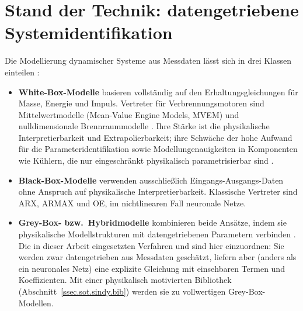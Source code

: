 
\chapter{Stand der Technik: datengetriebene Systemidentifikation}
\label{ch.standderTechnik}

Die Modellierung dynamischer Systeme aus Messdaten lässt sich in drei
Klassen einteilen \cite{isermannAutomotiveControlModeling2022}:

\begin{itemize}
  \item \textbf{White-Box-Modelle} basieren vollständig auf den
    Erhaltungsgleichungen für Masse, Energie und Impuls. Vertreter für
    Verbrennungsmotoren sind Mittelwertmodelle (Mean-Value Engine
    Models, MVEM) und nulldimensionale Brennraummodelle
    \cite{guzzellaIntroductionModelingControl2010, chmelaNulldimensionaleModellierung2019}.
    Ihre Stärke ist die physikalische Interpretierbarkeit und
    Extrapolierbarkeit; ihre Schwäche der hohe Aufwand für die
    Parameteridentifikation sowie Modellungenauigkeiten in Komponenten
    wie Kühlern, die nur eingeschränkt physikalisch parametrisierbar
    sind \cite{tangAccuracyMeanValue2024}.
  \item \textbf{Black-Box-Modelle} verwenden ausschließlich
    Eingangs-Ausgangs-Daten ohne Anspruch auf physikalische
    Interpretierbarkeit. Klassische Vertreter sind ARX, ARMAX und OE,
    im nichtlinearen Fall neuronale Netze.
  \item \textbf{Grey-Box- bzw.\ Hybridmodelle} kombinieren beide
    Ansätze, indem sie physikalische Modellstrukturen mit
    datengetriebenen Parametern verbinden
    \cite{wulffPhysicsinformedRegressionModels2025, ellisMachineLearningEnhanced2021, subramanianWhiteboxMachineLearning2021}.
    Die in dieser Arbeit eingesetzten Verfahren \sindy{} und \edmd{}
    \cite{bruntonDiscoveringGoverningEquations2016, williamsDataDrivenApproximation2015}
    sind hier einzuordnen: Sie werden zwar datengetrieben aus Messdaten
    geschätzt, liefern aber (anders als ein neuronales Netz) eine
    explizite Gleichung mit einsehbaren Termen und Koeffizienten. Mit
    einer physikalisch motivierten Bibliothek
    (Abschnitt~\ref{ssec.sot.sindy.bib}) werden sie zu vollwertigen
    Grey-Box-Modellen.
\end{itemize}

